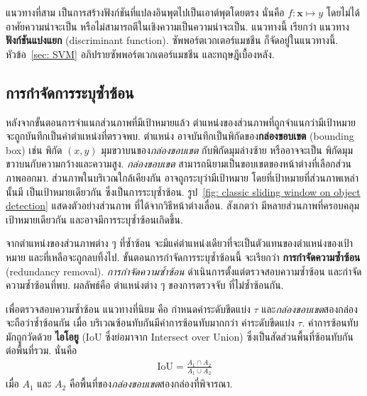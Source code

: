 แนวทางที่สาม เป็นการสร้างฟังก์ชันที่แปลงอินพุตไปเป็นเอาต์พุตโดยตรง นั่นคือ $f: \bm{x} \mapsto y$ โดยไม่ได้อาศัยความน่าจะเป็น
หรือไม่สามารถตีในเชิงความเป็นความน่าจะเป็น.
แนวทางนี้ เรียกว่า แนวทาง\textbf{ฟังก์ชันแบ่งแยก} (discriminant function).
ซัพพอร์ตเวกเตอร์แมชชีน ก็จัดอยู่ในแนวทางนี้.
หัวข้อ~\ref{sec: SVM} อภิปรายซัพพอร์ตเวกเตอร์แมชชีน และทฤษฎีเบื้องหลัง.

\subsection{การกำจัดการระบุซ้ำซ้อน}
\label{sec: classic redundancy removal}

หลังจากขั้นตอนการจำแนกส่วนภาพที่มีเป้าหมายแล้ว
ตำแหน่งของส่วนภาพที่ถูกจำแนกว่ามีเป้าหมาย จะถูกบันทึกเป็นค่าตำแหน่งที่ตรวจพบ.
ตำแหน่ง อาจบันทึกเป็นพิกัดของ\textbf{กล่องขอบเขต} (bounding box) 
เช่น พิกัด $(x,y)$ มุมขวาบนของ\textit{กล่องขอบเขต} กับพิกัดมุมล่างซ้าย
หรืออาจจะเป็น พิกัดมุมขวาบนกับความกว้างและความสูง.
\textit{กล่องขอบเขต} สามารถนิยามเป็นขอบเขตของหน้าต่างที่เลือกส่วนภาพออกมา.
ส่วนภาพในบริเวณใกล้เคียงกัน อาจถูกระบุว่ามีเป้าหมาย โดยที่เป้าหมายที่ส่วนภาพเหล่านั้นมี เป็นเป้าหมายเดียวกัน
ซึ่งเป็นการระบุซ้ำซ้อน.
รูป~\ref{fig: classic sliding window on object detection} แสดงตัวอย่างส่วนภาพ ที่ได้จากวิธีหน้าต่างเลื่อน.
สังเกตว่า มีหลายส่วนภาพที่ครอบคลุมเป้าหมายเดียวกัน และอาจมีการระบุซ้ำซ้อนเกิดขึ้น.

จากตำแหน่งของส่วนภาพต่าง ๆ ที่ซ้ำซ้อน จะมีแค่ตำแหน่งเดียวที่จะเป็นตัวแทนของตำแหน่งของเป้าหมาย
และที่เหลือจะถูกลบทิ้งไป.
ขั้นตอนการกำจัดการระบุซ้ำซ้อนนี้ จะเรียกว่า \textbf{การกำจัดความซ้ำซ้อน} (redundancy removal).
\textit{การกำจัดความซ้ำซ้อน} ดำเนินการตั้งแต่ตรวจสอบความซ้ำซ้อน และกำจัดความซ้ำซ้อนที่พบ.
ผลลัพธ์คือ ตำแหน่งต่าง ๆ ของการตรวจจับ ที่ไม่ซ้ำซ้อนกัน.

เพื่อตรวจสอบความซ้ำซ้อน
แนวทางที่นิยม คือ
กำหนดค่าระดับขีดแบ่ง $\tau$
และ\textit{กล่องขอบเขต}สองกล่อง
จะถือว่าซ้ำซ้อนกัน 
เมื่อ
บริเวณซ้อนทับกันมีค่าการซ้อนทับมากกว่า ค่าระดับขีดแบ่ง $\tau$.
ค่าการซ้อนทับ มักถูกวัดด้วย \textbf{ไอโอยู} (IoU ซึ่งย่อมาจาก Intersect over Union)
ซึ่งเป็นสัดส่วนพื้นที่ซ้อนทับกันต่อพื้นที่รวม.
นั่นคือ 
\begin{eqnarray}
\mathrm{IoU} = \frac{A_1 \cap A_2}{A_1 \cup A_2}
\label{eq: IoU}
\end{eqnarray}
เมื่อ $A_1$ และ $A_2$ คือพื้นที่ของ\textit{กล่องขอบเขต}สองกล่องที่พิจารณา.

